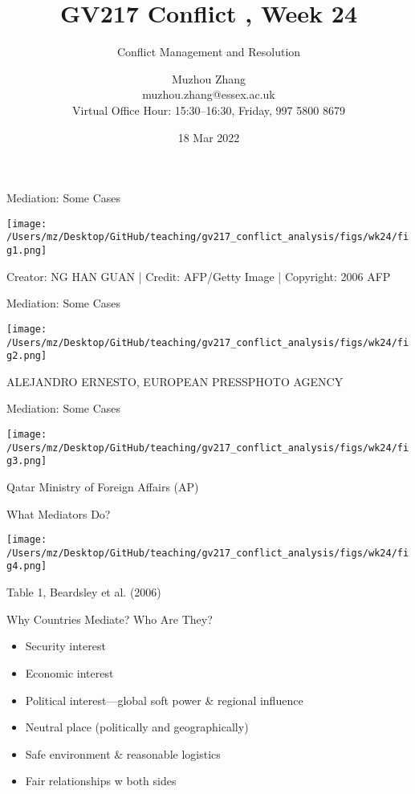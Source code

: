 \documentclass{beamer}
\title{GV217 Conflict , Week 24}
\subtitle{Conflict Management and Resolution}
\author{Muzhou Zhang\\ muzhou.zhang@essex.ac.uk\\ Virtual Office Hour: 15:30--16:30, Friday, 997 5800 8679}
\date{18 Mar 2022}
\begin{document}
\maketitle
{}

\begin{frame}{Mediation: Some Cases}
    \pause
    \begin{center}
        \texttt{[image: /Users/mz/Desktop/GitHub/teaching/gv217\_conflict\_analysis/figs/wk24/fig1.png]}
    \end{center}
    \tiny Creator: NG HAN GUAN | Credit: AFP/Getty Image | Copyright: 2006 AFP
\end{frame}

\begin{frame}{Mediation: Some Cases}
    \pause
    \begin{center}
        \texttt{[image: /Users/mz/Desktop/GitHub/teaching/gv217\_conflict\_analysis/figs/wk24/fig2.png]}
    \end{center}
    \tiny ALEJANDRO ERNESTO, EUROPEAN PRESSPHOTO AGENCY
\end{frame}

\begin{frame}{Mediation: Some Cases}
    \pause
    \begin{center}
        \texttt{[image: /Users/mz/Desktop/GitHub/teaching/gv217\_conflict\_analysis/figs/wk24/fig3.png]}
    \end{center}
    \tiny Qatar Ministry of Foreign Affairs (AP)
\end{frame}

\begin{frame}{What Mediators Do?}
    \pause
    \begin{center}
        \texttt{[image: /Users/mz/Desktop/GitHub/teaching/gv217\_conflict\_analysis/figs/wk24/fig4.png]}
    \end{center}
    \tiny Table 1, Beardsley et al. (2006)
\end{frame}

\begin{frame}{Why Countries Mediate? Who Are They?}
    \begin{itemize}
        \pause\item Security interest
        \pause\item Economic interest
        \pause\item Political interest---global soft power \& regional influence
        \pause\item Neutral place (politically and geographically)
        \pause\item Safe environment \& reasonable logistics
        \pause\item Fair relationships w both sides
    \end{itemize}
\end{frame}
\end{document}
